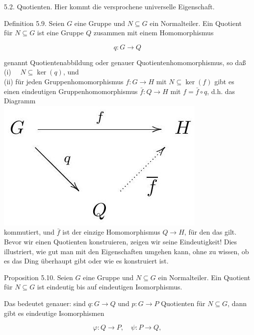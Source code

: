 \documentclass[10pt, letterpaper]{article}
\begin{document}
5.2. Quotienten. Hier kommt die versprochene universelle Eigenschaft.

Definition 5.9. Seien $G$ eine Gruppe und $N \subseteq G$ ein Normalteiler. Ein Quotient für $N \subseteq G$ ist eine Gruppe $Q$ zusammen mit einem Homomorphismus

$$
q: G \rightarrow Q
$$

genannt Quotientenabbildung oder genauer Quotientenhomomorphismus, so daß\\
(i) $\quad N \subseteq \operatorname{ker}(q)$, und\\
(ii) für jeden Gruppenhomomorphismus $f: G \rightarrow H$ mit $N \subseteq \operatorname{ker}(f)$ gibt es einen eindeutigen Gruppenhomomorphismus $\bar{f}: Q \rightarrow H$ mit $f=\bar{f} \circ q$, d.h. das Diagramm\\
\includegraphics[max width=\textwidth, center]{2025_06_13_6ba93caed1e95a95104eg-037}\\
kommutiert, und $\bar{f}$ ist der einzige Homomorphismus $Q \rightarrow H$, für den das gilt.\\
Bevor wir einen Quotienten konstruieren, zeigen wir seine Eindeutigkeit! Dies illustriert, wie gut man mit den Eigenschaften umgehen kann, ohne zu wissen, ob es das Ding überhaupt gibt oder wie es konstruiert ist.

Proposition 5.10. Seien $G$ eine Gruppe und $N \subseteq G$ ein Normalteiler. Ein Quotient für $N \subseteq G$ ist eindeutig bis auf eindeutigen Isomorphismus.

Das bedeutet genauer: sind $q: G \rightarrow Q$ und $p: G \rightarrow P$ Quotienten für $N \subseteq G$, dann gibt es eindeutige Isomorphismen

$$
\varphi: Q \rightarrow P, \quad \psi: P \rightarrow Q,
$$
\end{document}
